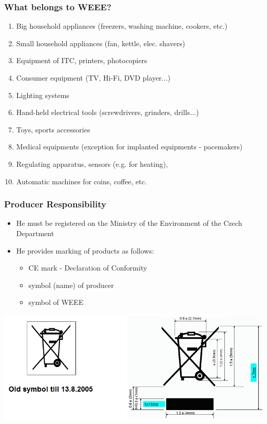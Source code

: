 \documentclass{beamer}
\begin{document}
	\begin{frame}
    \frametitle{What belongs to WEEE?}
			\begin{enumerate}
				\item Big household appliances (freezers, washing machine, cookers, etc.)
				\item Small household appliances (fan, kettle, elec. shavers)
				\item Equipment of ITC, printers, photocopiers
				\item Consumer equipment (TV, Hi-Fi, DVD player...)
				\item Lighting systems
				\item Hand-held electrical tools (screwdrivers, grinders, drills...) 
				\item Toys, sports accessories
				\item Medical equipments (exception for implanted equipments - pacemakers) 
				\item Regulating apparatus, sensors (e.g. for heating), 
				\item Automatic machines for coins, coffee, etc.
			\end{enumerate}
	\end{frame}
	\begin{frame}
    \frametitle{Producer Responsibility}
			\begin{itemize}
				\item He must be registered on the Ministry of the Environment of the Czech Department
				\item He provides marking of products as follows:
				\begin{itemize}
					\item CE mark - Declaration of Conformity
					\item symbol (name) of producer
					\item symbol of WEEE
				\end{itemize}
			\end{itemize}
			\begin{center}
			\includegraphics[scale=0.4]{obr06_symbolWEEE.png}
			\end{center}
	\end{frame}
\end{document}

